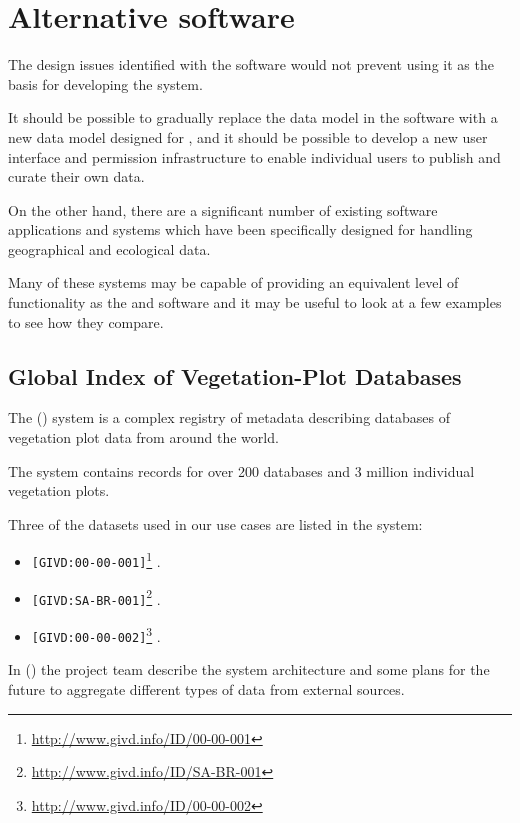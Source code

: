 \documentclass{article}
\begin{document}
\section{Alternative software}

The design issues identified with the \cite{ivoa} software would not prevent
using it as the basis for developing the \cite{trop} system.

It should be possible to gradually replace the \cite{ivoa-obscore} data model
in the \cite{ivoa} software with a new data model designed for \cite{trop},
and it should be possible to develop a new user interface and permission
infrastructure to enable individual users to publish and curate their
own data.

On the other hand, there are a significant number of existing software applications
and systems which have been specifically designed for handling geographical and
ecological data.

Many of these systems may be capable of providing an equivalent level
of functionality as the \cite{ivoa} and \cite{astro} software and it
may be useful to look at a few examples to see how they compare.

\subsection{Global Index of Vegetation-Plot Databases}

The  (\cite{givd}) system is a complex registry of metadata
describing databases of vegetation plot data from around the world.

The \cite{givd} system contains records for over 200 databases and 3 million
individual vegetation plots.

Three of the datasets used in our use cases are listed in the \cite{givd}
system:

\begin{itemize}
    \item \texttt{[GIVD:00-00-001]}\footnote{\url{http://www.givd.info/ID/00-00-001}} \cite{forest-plots}.
    \item \texttt{[GIVD:SA-BR-001]}\footnote{\url{http://www.givd.info/ID/SA-BR-001}} \cite{ppbio}.
    \item \texttt{[GIVD:00-00-002]}\footnote{\url{http://www.givd.info/ID/00-00-002}} \cite{team}.
\end{itemize}

In  (\cite{dengler-2011}) the \cite{givd} project
team describe the system architecture and some plans for the future to
aggregate different types of data from external sources.
\end{document}
